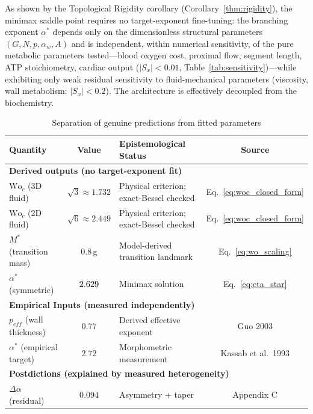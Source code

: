 As shown by the Topological Rigidity corollary
(Corollary~\ref{thm:rigidity}), the minimax saddle point requires no
target-exponent fine-tuning: the branching exponent $\alpha^*$ depends only on
the dimensionless structural parameters $(G, N, p, \alpha_w, A)$ and is
independent, within numerical sensitivity, of the pure metabolic parameters
tested---blood oxygen cost, proximal flow, segment length, ATP stoichiometry,
cardiac output ($|S_x| < 0.01$, Table~\ref{tab:sensitivity})---while exhibiting
only weak residual sensitivity to fluid-mechanical parameters (viscosity, wall
metabolism: $|S_x| < 0.2$). The architecture is effectively decoupled from the
biochemistry.

\begin{table}[H]
\centering
\caption{Separation of genuine predictions from fitted parameters}
\renewcommand{\tabularxcolumn}[1]{m{#1}}
\begin{tabularx}{\textwidth}{lc>{\raggedright\arraybackslash}Xc}
\toprule
Quantity & Value & Epistemological Status & Source \\
\midrule
\multicolumn{4}{l}{\textbf{Derived outputs (no target-exponent fit)}} \\
$\mathrm{Wo}_c$ (3D fluid) & $\sqrt{3} \approx 1.732$ & Physical criterion; exact-Bessel checked & Eq.~\eqref{eq:woc_closed_form} \\
$\mathrm{Wo}_c$ (2D fluid) & $\sqrt{6} \approx 2.449$ & Physical criterion; exact-Bessel checked & Eq.~\eqref{eq:woc_closed_form} \\
$M^*$ (transition mass) & $0.8$\,g & Model-derived transition landmark & Eq.~\eqref{eq:wo_scaling} \\
$\alpha^*$ (symmetric) & $2.629$ & Minimax solution & Eq.~\eqref{eq:eta_star} \\
\midrule
\multicolumn{4}{l}{\textbf{Empirical Inputs (measured independently)}} \\
$p_{eff}$ (wall thickness) & $0.77$ & Derived effective exponent & Guo 2003 \cite{Guo2003} \\
$\alpha^*$ (empirical target) & $2.72$ & Morphometric measurement & Kassab et al.\ 1993 \\
\midrule
\multicolumn{4}{l}{\textbf{Postdictions (explained by measured heterogeneity)}} \\
$\Delta\alpha$ (residual) & $0.094$ & Asymmetry + taper & Appendix C \\
\bottomrule
\end{tabularx}
\end{table}

